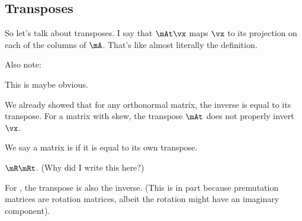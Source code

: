 \subsection{Transposes}

So let's talk about transposes. I say that $\mAt \vx$ maps $\vx$ to its
projection on each of the columns of $\mA$. That's like almost literally
the definition.

Also note:

\begin{nedqn}
  \mA\vx
\eqcol
    \parenstrans{
        \vxt \mAt
    }
\end{nedqn}

This is maybe obvious.

We already showed that for any orthonormal matrix, the inverse is
equal to its transpose. For a matrix with skew, the transpose
$\mAt$ does not properly invert $\vx$.

We say a matrix is  if it is equal to its own
transpose.

$\mR\mRt$. (Why did I write this here?)

For , the transpose is also the inverse.
(This is in part because premutation matrices are rotation matrices,
albeit the rotation might have an imaginary component).

